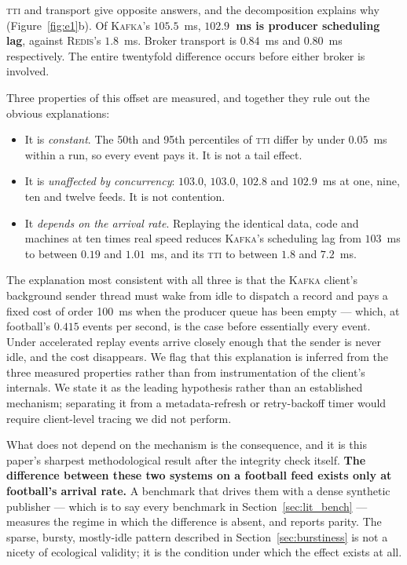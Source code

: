 \documentclass[Afour,sageh,times]{sagej}
\newcommand{\redis}{\textsc{Redis}}
\newcommand{\kafka}{\textsc{Kafka}}
\newcommand{\tti}{\textsc{tti}}
\begin{document}
\tti{} and transport give opposite answers, and the decomposition explains why
(Figure~\ref{fig:e1}b). Of \kafka{}'s $105.5$~ms, \textbf{$102.9$~ms is producer scheduling lag},
against \redis{}'s $1.8$~ms. Broker transport is $0.84$~ms and $0.80$~ms respectively. The entire
twentyfold difference occurs before either broker is involved.

Three properties of this offset are measured, and together they rule out the obvious
explanations:

\begin{itemize}
\item It is \emph{constant}. The 50th and 95th percentiles of \tti{} differ by under $0.05$~ms
within a run, so every event pays it. It is not a tail effect.
\item It is \emph{unaffected by concurrency}: $103.0$, $103.0$, $102.8$ and $102.9$~ms at one,
nine, ten and twelve feeds. It is not contention.
\item It \emph{depends on the arrival rate}. Replaying the identical data, code and machines at
ten times real speed reduces \kafka{}'s scheduling lag from $103$~ms to between $0.19$ and
$1.01$~ms, and its \tti{} to between $1.8$ and $7.2$~ms.
\end{itemize}

The explanation most consistent with all three is that the \kafka{} client's background sender
thread must wake from idle to dispatch a record and pays a fixed cost of order 100~ms when the
producer queue has been empty --- which, at football's $0.415$ events per second, is the case
before essentially every event. Under accelerated replay events arrive closely enough that the
sender is never idle, and the cost disappears. We flag that this explanation is inferred from the
three measured properties rather than from instrumentation of the client's internals. We state it
as the leading hypothesis rather than an established mechanism; separating it from a
metadata-refresh or retry-backoff timer would require client-level tracing we did not perform.

What does not depend on the mechanism is the consequence, and it is this paper's sharpest
methodological result after the integrity check itself. \textbf{The difference between these two
systems on a football feed exists only at football's arrival rate.} A benchmark that drives them
with a dense synthetic publisher --- which is to say every benchmark in
Section~\ref{sec:lit_bench} --- measures the regime in which the difference is absent, and
reports parity. The sparse, bursty, mostly-idle pattern described in Section~\ref{sec:burstiness}
is not a nicety of ecological validity; it is the condition under which the effect exists at all.
\end{document}

